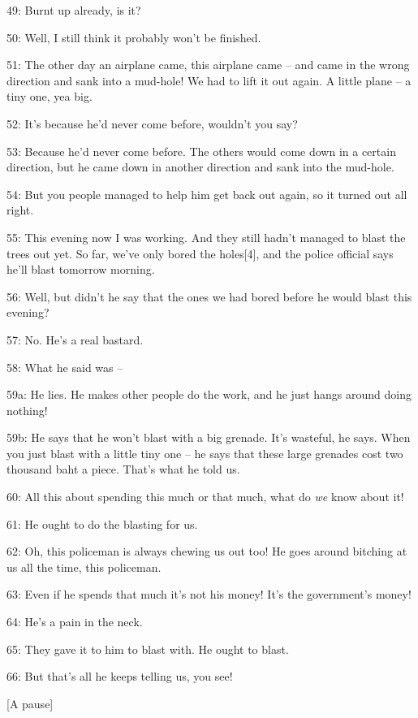 {49: Burnt up already, is it?}

{50: Well, I still think it probably won't be finished.}

{51: The other day an airplane came, this airplane came -- and came in the
wrong direction and sank into a mud-hole! We had to lift it out again. A little
plane -- a tiny one, yea big. }

{52: It's because he'd never come before, wouldn't you say?}

{53: Because he'd never come before. The others would come down in a certain
direction, but he came down in another direction and sank into the mud-hole.}

{54: But you people managed to help him get back out again, so it turned
out all right. }

{55: This evening now I was working. And they still hadn't managed to blast
the trees out yet. So far, we've only bored the holes[4], and the police official
says he'll blast tomorrow morning. }

{56: Well, but didn't he say that the ones we had bored before he would
blast this evening?}

{57: No. He's a real bastard. }

{58: What he said was --}

{59a: He lies. He makes other people do the work, and he just hangs around
doing nothing!}

{59b: He says that he won't blast with a big grenade. It's wasteful, he
says. When you just blast with a little tiny one -- he says that these large grenades
cost two thousand baht a piece. That's what he told us. }

{60: All this about spending this much or that much, what do }{\textit{we}}{
know about it! }

{61: He ought to do the blasting for us.}

{62: Oh, this policeman is always chewing us out too! He goes around bitching
at us all the time, this policeman.}

{63: Even if he spends that much it's not his money! It's the government's
money! }

{64: He's a pain in the neck.}

{65: They gave it to him to blast with. He ought to blast. }

{66: But that's all he keeps telling us, you see! }

\begin{center}
{[A pause] }
\end{center}

